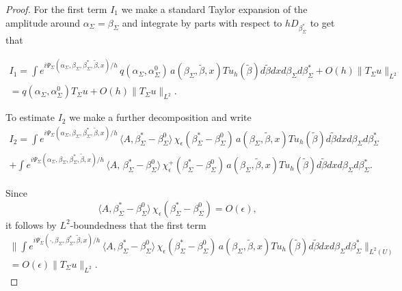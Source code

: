 \documentclass[11pt,reqno]{amsart}
\theoremstyle{definition}
\begin{document}
\begin{proof}
For the first term $I_1$ we make a standard Taylor expansion of the amplitude around $\alpha_{\Sigma} = \beta_{\Sigma}$ and integrate by parts with respect to $hD_{\beta_{\Sigma}^*}$ to get that

\begin{eqnarray} \label{I1}
I_1 =   \int e^{i \Psi_{\Sigma}(\alpha_{\Sigma}, \beta_{\Sigma}, \beta_{\Sigma}^*, \tilde{\beta},x)/h} \, q(\alpha_{\Sigma}, \alpha_{\Sigma}^{0}) \, a (\beta_{\Sigma}, \tilde{\beta},x) Tu_h(\tilde{\beta}) d\tilde{\beta}  dx d\beta_{\Sigma} d \beta_{\Sigma}^* + O(h) \| T_{\Sigma} u \|_{L^2} \nonumber \\
=  q(\alpha_{\Sigma}, \alpha_{\Sigma}^{0}) T_{\Sigma}u +  O(h) \| T_{\Sigma} u \|_{L^2}. \hspace{2in}
 \end{eqnarray}

 
 To estimate $I_2$ we make a further decomposition and write
\begin{eqnarray} \label{I2}
I_2 = \int e^{i \Psi_{\Sigma}(\alpha_{\Sigma}, \beta_{\Sigma}, \beta_{\Sigma}^*, \tilde{\beta},x)/h} \, \langle A, \beta^{*}_{\Sigma} - \beta_{\Sigma}^{0}  \rangle  \, \chi_{\epsilon} ( \beta^{*}_{\Sigma} - \beta_{\Sigma}^{0}  ) \, a (\beta_{\Sigma}, \tilde{\beta},x) Tu_h(\tilde{\beta}) d\tilde{\beta}  dx d\beta_{\Sigma} d \beta_{\Sigma}^* \nonumber \\
+ \int e^{i \Psi_{\Sigma}(\alpha_{\Sigma}, \beta_{\Sigma}, \beta_{\Sigma}^*, \tilde{\beta},x)/h} \, \langle A,   \,  \beta^{*}_{\Sigma} - \beta_{\Sigma}^{0}  \rangle  \, \chi_{\epsilon}^+ ( \beta^{*}_{\Sigma} - \beta_{\Sigma}^{0}  ) \, a (\beta_{\Sigma}, \tilde{\beta},x) Tu_h(\tilde{\beta}) d\tilde{\beta}  dx d\beta_{\Sigma} d \beta_{\Sigma}^* .
\end{eqnarray}

Since 
 $$\langle A, \beta^{*}_{\Sigma} - \beta_{\Sigma}^{0}  \rangle  \, \chi_{\epsilon} ( \beta^{*}_{\Sigma} - \beta_{\Sigma}^{0}  ) = O(\epsilon),$$
 it follows by $L^2$-boundedness that the first term
 \begin{eqnarray} \label{I2.1}
 \Big\|  \int e^{i \Psi_{\Sigma}(\cdot, \beta_{\Sigma}, \beta_{\Sigma}^*, \tilde{\beta},x)/h} \, \langle A, \beta^{*}_{\Sigma} - \beta_{\Sigma}^{0}  \rangle  \, \chi_{\epsilon} ( \beta^{*}_{\Sigma} - \beta_{\Sigma}^{0}  ) \, a (\beta_{\Sigma}, \tilde{\beta},x) Tu_h(\tilde{\beta}) d\tilde{\beta}  dx d\beta_{\Sigma} d \beta_{\Sigma}^* \Big\|_{L^2(U)} \nonumber \\
 = O(\epsilon) \|T_{\Sigma} u \|_{L^2}.\end{eqnarray}
 


\end{proof}
\end{document}
